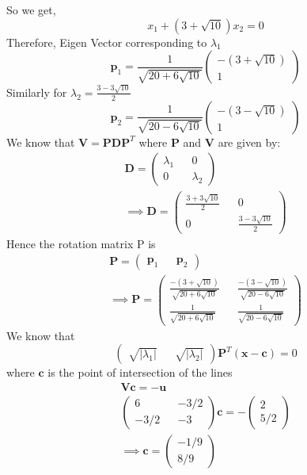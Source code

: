 \documentclass[journal,13pt,twocolumn]{IEEEtran}
\newcommand{\myvec}[1]{\ensuremath{\begin{pmatrix}#1\end{pmatrix}}}
\renewcommand{\vec}[1]{\mathbf{#1}}
\begin{document}
So we get,
\begin{equation}\label{eq:2.14}
x_1 + (3+\sqrt{10})x_2 = 0
\end{equation}
Therefore, Eigen Vector corresponding to $\lambda_1$
\begin{equation}\label{eq:2.15}
\vec{p}_1 =\frac{1}{\sqrt{20+6\sqrt{10}}} \myvec{-(3+\sqrt{10}) \\ 1}
\end{equation}
Similarly for $\lambda_2 = \frac{3-3\sqrt{10}}{2}$
\begin{equation}\label{eq:2.16}
\vec{p}_2 =\frac{1}{\sqrt{20-6\sqrt{10}}} \myvec{-(3-\sqrt{10}) \\ 1}
\end{equation}
We know that $\vec{V} = \vec{P}\vec{D}\vec{P}^T$ where $\vec{P}$ and $\vec{V}$ are given by:
\begin{equation} \label{eq:2.17}
\begin{split}
\vec{D} = \myvec{\lambda_1 && 0\\ 0 && \lambda_2}\\
\implies \vec{D} = \myvec{\frac{3+3\sqrt{10}}{2} && 0\\ 0 &&\frac{3-3\sqrt{10}}{2} }
\end{split}
\end{equation}
Hence the rotation matrix P is
\begin{equation} \label{eq:2.18}
\begin{split}
\vec{P} = \myvec{\vec{p}_1 && \vec{p}_2}\\
\implies \vec{P} = \myvec{\frac{-(3+\sqrt{10})}{\sqrt{20+6\sqrt{10}}} && \frac{-(3-\sqrt{10})}{\sqrt{20-6\sqrt{10}}} \\ \frac{1}{\sqrt{20+6\sqrt{10}}} && \frac{1}{\sqrt{20-6\sqrt{10}}}}
\end{split}
\end{equation}
We know that 
\begin{equation} \label{eq:2.19}
\myvec{\sqrt{|\lambda_1|} && \sqrt{|\lambda_2|}}\vec{P}^T(\vec{x}-\vec{c}) = 0
\end{equation}
where $\vec{c}$ is the point of intersection of the lines 
\begin{equation} \label{eq:2.20}
\begin{split}
\vec{V}\vec{c} = -\vec{u}\\
\myvec{6 && -3/2\\-3/2 && -3} \vec{c} = -\myvec{2 \\ 5/2}\\
\implies \vec{c} = \myvec{-1/9 \\ 8/9}
\end{split}
\end{equation}
\end{document}
